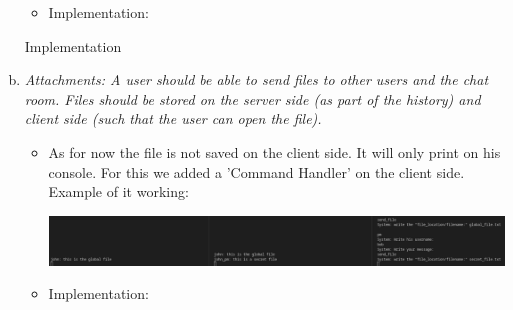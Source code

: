 \begin{enumerate}[(a)]
\begin{itemize}
\newpage        
        \item Implementation:
        
        
        
    \end{itemize}Implementation

\newpage
    \item {\itshape Attachments: A user should be able to send files to other users and the chat room. Files should be stored on the server side (as part of the history) and client side (such that the user can open the file).}
    \begin{itemize}
        \item As for now the file is not saved on the client side. It will only print on his console. For this we added a 'Command Handler' on the client side. Example of it working:
        
        \includegraphics[width=\textwidth]{src/u7/4.png}
        
        \item Implementation:
        
        
    \end{itemize}

\end{enumerate}

